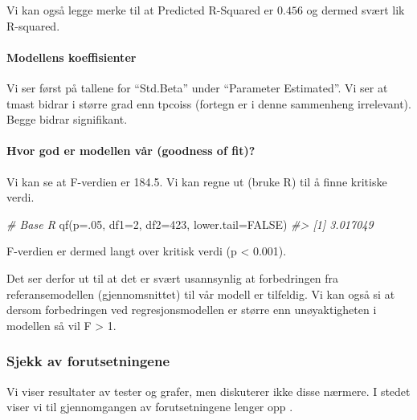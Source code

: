 \documentclass[
]{article}
\newenvironment{Shaded}{\begin{snugshade}}{\end{snugshade}}
\newcommand{\AttributeTok}[1]{\textcolor[rgb]{0.77,0.63,0.00}{#1}}
\newcommand{\CommentTok}[1]{\textcolor[rgb]{0.56,0.35,0.01}{\textit{#1}}}
\newcommand{\ConstantTok}[1]{\textcolor[rgb]{0.00,0.00,0.00}{#1}}
\newcommand{\DecValTok}[1]{\textcolor[rgb]{0.00,0.00,0.81}{#1}}
\newcommand{\FunctionTok}[1]{\textcolor[rgb]{0.00,0.00,0.00}{#1}}
\newcommand{\NormalTok}[1]{#1}
\begin{document}
Vi kan også legge merke til at Predicted R-Squared er \(0.456\) og dermed svært lik R-squared.

\hypertarget{modellens-koeffisienter}{%
\paragraph{Modellens koeffisienter}\label{modellens-koeffisienter}}

Vi ser først på tallene for ``Std.Beta'' under ``Parameter Estimated''. Vi ser at tmast bidrar i større grad enn tpcoiss (fortegn er i denne sammenheng irrelevant). Begge bidrar signifikant.

\hypertarget{hvor-god-er-modellen-vuxe5r-goodness-of-fit-1}{%
\paragraph{Hvor god er modellen vår (goodness of fit)?}\label{hvor-god-er-modellen-vuxe5r-goodness-of-fit-1}}

Vi kan se at F-verdien er 184.5. Vi kan regne ut (bruke R) til å finne kritiske verdi.

\begin{Shaded}
\begin{Highlighting}[]
\CommentTok{\# Base R}
\FunctionTok{qf}\NormalTok{(}\AttributeTok{p=}\NormalTok{.}\DecValTok{05}\NormalTok{, }\AttributeTok{df1=}\DecValTok{2}\NormalTok{, }\AttributeTok{df2=}\DecValTok{423}\NormalTok{, }\AttributeTok{lower.tail=}\ConstantTok{FALSE}\NormalTok{)}
\CommentTok{\#\textgreater{} [1] 3.017049}
\end{Highlighting}
\end{Shaded}

F-verdien er dermed langt over kritisk verdi (p \textless{} 0.001).

Det ser derfor ut til at det er svært usannsynlig at forbedringen fra referansemodellen (gjennomsnittet) til vår modell er tilfeldig. Vi kan også si at dersom forbedringen ved regresjonsmodellen er større enn unøyaktigheten i modellen så vil F \textgreater{} 1.

\hypertarget{sjekk-av-forutsetningene}{%
\subsubsection{Sjekk av forutsetningene}\label{sjekk-av-forutsetningene}}

Vi viser resultater av tester og grafer, men diskuterer ikke disse nærmere. I stedet viser vi til gjennomgangen av forutsetningene lenger opp .
\end{document}
